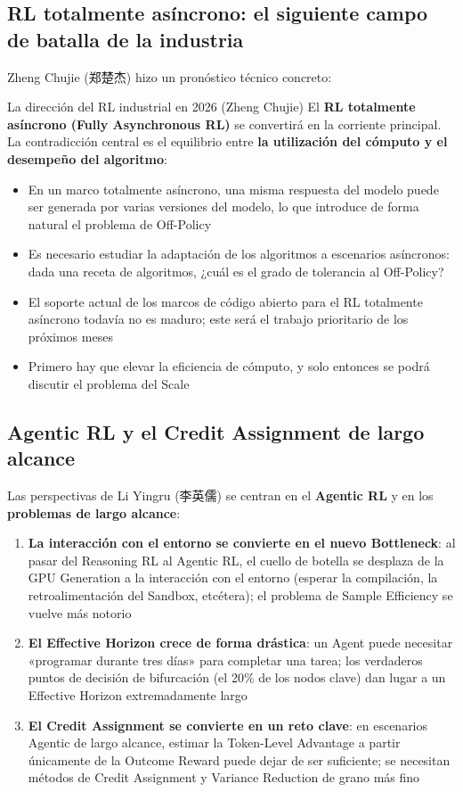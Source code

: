 \subsection{RL totalmente asíncrono: el siguiente campo de batalla de la industria}

Zheng Chujie (郑楚杰) hizo un pronóstico técnico concreto:

\begin{importantbox}{La dirección del RL industrial en 2026 (Zheng Chujie)}
El \textbf{RL totalmente asíncrono (Fully Asynchronous RL)} se convertirá en la corriente principal. La contradicción central es el equilibrio entre \textbf{la utilización del cómputo y el desempeño del algoritmo}:
\begin{itemize}
    \item En un marco totalmente asíncrono, una misma respuesta del modelo puede ser generada por varias versiones del modelo, lo que introduce de forma natural el problema de Off-Policy
    \item Es necesario estudiar la adaptación de los algoritmos a escenarios asíncronos: dada una receta de algoritmos, ¿cuál es el grado de tolerancia al Off-Policy?
    \item El soporte actual de los marcos de código abierto para el RL totalmente asíncrono todavía no es maduro; este será el trabajo prioritario de los próximos meses
    \item Primero hay que elevar la eficiencia de cómputo, y solo entonces se podrá discutir el problema del Scale
\end{itemize}
\end{importantbox}

\subsection{Agentic RL y el Credit Assignment de largo alcance}

Las perspectivas de Li Yingru (李英儒) se centran en el \textbf{Agentic RL} y en los \textbf{problemas de largo alcance}:

\begin{enumerate}
    \item \textbf{La interacción con el entorno se convierte en el nuevo Bottleneck}: al pasar del Reasoning RL al Agentic RL, el cuello de botella se desplaza de la GPU Generation a la interacción con el entorno (esperar la compilación, la retroalimentación del Sandbox, etcétera); el problema de Sample Efficiency se vuelve más notorio
    \item \textbf{El Effective Horizon crece de forma drástica}: un Agent puede necesitar «programar durante tres días» para completar una tarea; los verdaderos puntos de decisión de bifurcación (el 20\% de los nodos clave) dan lugar a un Effective Horizon extremadamente largo
    \item \textbf{El Credit Assignment se convierte en un reto clave}: en escenarios Agentic de largo alcance, estimar la Token-Level Advantage a partir únicamente de la Outcome Reward puede dejar de ser suficiente; se necesitan métodos de Credit Assignment y Variance Reduction de grano más fino
\end{enumerate}

